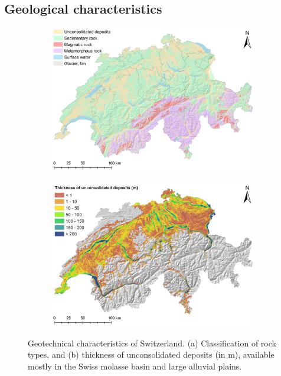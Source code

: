 \subsection{Geological characteristics}

\begin{figure}[tb]
\centering
\begin{subfigure}{.49\textwidth}
  \centering
  \includegraphics[width=.9\linewidth]{images/Figs/rockType_CH.png}  
  \caption{}
  \label{figa:geoCH}
\end{subfigure}
\begin{subfigure}{.49\textwidth}
  \centering
  \includegraphics[width=.9\linewidth]{images/Figs/thickness_unconsolidated_deposits_CH.png}  
  \caption{}
  \label{figb:geoCH}
\end{subfigure}
\caption{Geotechnical characteristics of Switzerland. (a) Classification of rock types, and (b) thickness of unconsolidated deposits (in m), available mostly in the Swiss molasse basin and large alluvial plains.}
\label{fig:geoCH}
\end{figure}

